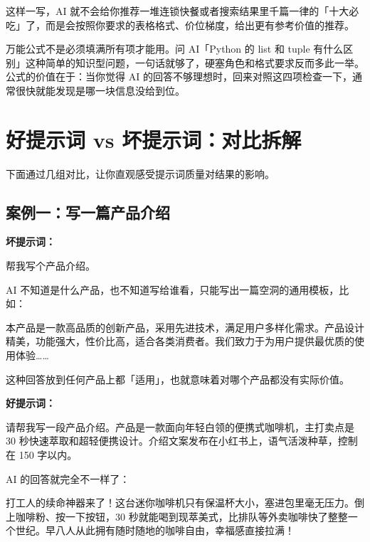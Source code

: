 这样一写，AI 就不会给你推荐一堆连锁快餐或者搜索结果里千篇一律的「十大必吃」了，而是会按照你要求的表格格式、价位梯度，给出更有参考价值的推荐。

\begin{tipbox}
万能公式不是必须填满所有项才能用。问 AI「Python 的 list 和 tuple 有什么区别」这种简单的知识型问题，一句话就够了，硬塞角色和格式要求反而多此一举。公式的价值在于：当你觉得 AI 的回答不够理想时，回来对照这四项检查一下，通常很快就能发现是哪一块信息没给到位。
\end{tipbox}

\section{好提示词 vs 坏提示词：对比拆解}

下面通过几组对比，让你直观感受提示词质量对结果的影响。

\subsection*{案例一：写一篇产品介绍}

\textbf{坏提示词：}
\begin{promptbox}
帮我写个产品介绍。
\end{promptbox}

AI 不知道是什么产品，也不知道写给谁看，只能写出一篇空洞的通用模板，比如：

\begin{aibox}
本产品是一款高品质的创新产品，采用先进技术，满足用户多样化需求。产品设计精美，功能强大，性价比高，适合各类消费者。我们致力于为用户提供最优质的使用体验……
\end{aibox}

这种回答放到任何产品上都「适用」，也就意味着对哪个产品都没有实际价值。

\textbf{好提示词：}
\begin{promptbox}
请帮我写一段产品介绍。产品是一款面向年轻白领的便携式咖啡机，主打卖点是 30 秒快速萃取和超轻便携设计。介绍文案发布在小红书上，语气活泼种草，控制在 150 字以内。
\end{promptbox}

AI 的回答就完全不一样了：

\begin{aibox}
打工人的续命神器来了！这台迷你咖啡机只有保温杯大小，塞进包里毫无压力。倒上咖啡粉、按一下按钮，30 秒就能喝到现萃美式，比排队等外卖咖啡快了整整一个世纪。早八人从此拥有随时随地的咖啡自由，幸福感直接拉满！
\end{aibox}

